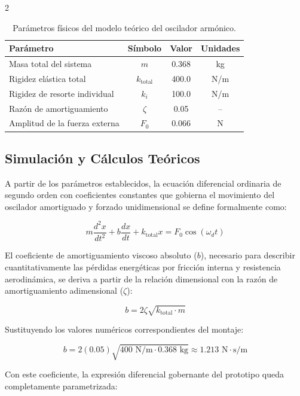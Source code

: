 \documentclass[10pt]{article}
\begin{document}
\begin{multicols}{2}
\begin{table}[H]
\centering
\caption{Parámetros físicos del modelo teórico del oscilador armónico.}
\label{tab:parametros_teoricos}
\begin{tabular}{lccc}
\hline
\textbf{Parámetro} & \textbf{Símbolo} & \textbf{Valor} & \textbf{Unidades} \\ \hline
Masa total del sistema & $m$ & 0.368 & kg \\
Rigidez elástica total & $k_{\text{total}}$ & 400.0 & N/m \\
Rigidez de resorte individual & $k_i$ & 100.0 & N/m \\
Razón de amortiguamiento & $\zeta$ & 0.05 & -- \\
Amplitud de la fuerza externa & $F_0$ & 0.066 & N \\ \hline
\end{tabular}
\end{table}

\subsection{Simulación y Cálculos Teóricos}

A partir de los parámetros establecidos, la ecuación diferencial ordinaria de segundo orden con coeficientes constantes que gobierna el movimiento del oscilador amortiguado y forzado unidimensional se define formalmente como:

\begin{equation}
m\frac{d^2x}{dt^2} + b\frac{dx}{dt} + k_{\text{total}}x = F_0\cos(\omega_d t)
\end{equation}

El coeficiente de amortiguamiento viscoso absoluto ($b$), necesario para describir cuantitativamente las pérdidas energéticas por fricción interna y resistencia aerodinámica, se deriva a partir de la relación dimensional con la razón de amortiguamiento adimensional ($\zeta$):

\begin{equation}
b = 2\zeta\sqrt{k_{\text{total}} \cdot m}
\end{equation}

Sustituyendo los valores numéricos correspondientes del montaje:

\begin{equation}
b = 2(0.05)\sqrt{400 \text{ N/m} \cdot 0.368 \text{ kg}} \approx 1.213 \text{ N}\cdot\text{s/m}
\end{equation}

Con este coeficiente, la expresión diferencial gobernante del prototipo queda completamente parametrizada:


\end{multicols}
\end{document}
